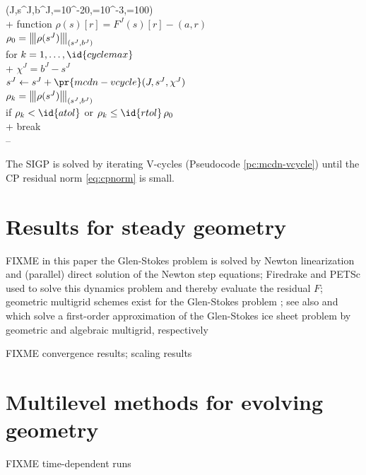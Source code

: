 \documentclass[letterpaper,final,12pt,reqno]{amsart}
\theoremstyle{claim}
\newcommand{\ip}[2]{\left(#1,#2\right)}
\newcommand{\vertiii}[1]{{\left\vert\kern-0.25ex\left\vert\kern-0.25ex\left\vert #1 \right\vert\kern-0.25ex\right\vert\kern-0.25ex\right\vert}}
\numberwithin{equation}{section}
\numberwithin{figure}{section}
\numberwithin{table}{section}
\numberwithin{theorem}{section}
\begin{document}
\begin{pcode}[ht]
\begin{pseudo*}
(J,s^J,b^J,=10^{-20},=10^{-3},=100)\text{:} \\+
    function $\rho(s)[r] = F^J(s)[r] - \ip{a}{r}$ \qquad\qquad {} \\
    $\rho_0=\vertiii{\rho(s^J)}_{(s^J,b^J)}$ \\
    for $k=1,\dots,\id{cyclemax}$ \\+
        $\chi^J = b^J - s^J$ \qquad\qquad {} \\
        $s^J \gets s^J + \pr{mcdn-vcycle}(J,s^J,\chi^J)$ \\
        $\rho_k=\vertiii{\rho(s^J)}_{(s^J,b^J)}$ \\
        if $\rho_k < \id{atol}$ or $\rho_k \le \id{rtol} \, \rho_0$ \\+
            break \\--
\end{pseudo*}
\caption{The SIGP is solved by iterating V-cycles (Pseudocode \ref{pc:mcdn-vcycle}) until the CP residual norm \eqref{eq:cpnorm} is small.}
\label{pc:mcdn-solver}
\end{pcode}


\section{Results for steady geometry} \label{sec:results}

FIXME in this paper the Glen-Stokes problem is solved by Newton linearization and (parallel) direct solution of the Newton step equations; Firedrake and PETSc \cite{Balayetal2020,Bueler2021} used to solve this dynamics problem and thereby evaluate the residual $F$; geometric multigrid schemes exist for the  Glen-Stokes problem \cite{IsaacStadlerGhattas2015}; see also \cite{BrownSmithAhmadia2013} and \cite{Tuminaroetal2016} which solve a first-order approximation of the Glen-Stokes ice sheet problem by geometric and algebraic multigrid, respectively

FIXME convergence results; scaling results


\section{Multilevel methods for evolving geometry} \label{sec:evolution}

FIXME time-dependent runs
\end{document}
